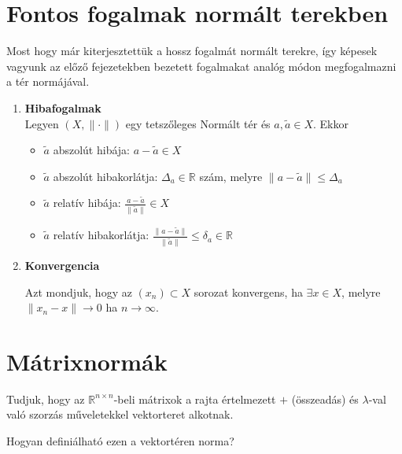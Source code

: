 \section{Fontos fogalmak normált terekben}
Most hogy már kiterjesztettük a hossz fogalmát normált terekre, így képesek vagyunk az előző fejezetekben bezetett fogalmakat analóg módon megfogalmazni a tér normájával.
\begin{enumerate}
    \item \textbf{Hibafogalmak} \\
    Legyen $(X, \| \cdot \|)$ egy tetszőleges Normált tér és $a, \tilde{a} \in X$. Ekkor
    \begin{itemize}
        \item $\tilde{a}$ abszolút hibája: $a - \tilde{a} \in X$ 
        \item $\tilde{a}$ abszolút hibakorlátja: $\Delta_{a} \in \mathbb{R}$ szám, melyre $\| a- \tilde{a} \| \leq \Delta_{a}$ 
        \item $\tilde{a}$ relatív hibája: $\frac{a - \tilde{a}}{ \| \tilde{a} \|} \in X$
        \item $\tilde{a}$ relatív hibakorlátja: $\frac{\| a- \tilde{a} \|}{ \| \tilde{a} \|} \leq \delta_{a}\in\mathbb{R}$
    \end{itemize}

    
    \item \textbf{Konvergencia}
    \begin{definition}
        Azt mondjuk, hogy az $(x_{n}) \subset X$ sorozat konvergens, ha $\exists x \in X$, melyre $\| x_{n}- x \| \to 0$ ha $n \to \infty$.
    \end{definition}
\end{enumerate}

\section{Mátrixnormák}
Tudjuk, hogy az $\mathbb{R}^{n \times n}$-beli mátrixok a rajta értelmezett $+$ (összeadás) és $\lambda$-val való szorzás műveletekkel vektorteret alkotnak.
\begin{kerdes}
    Hogyan definiálható ezen a vektortéren norma?
\end{kerdes}

